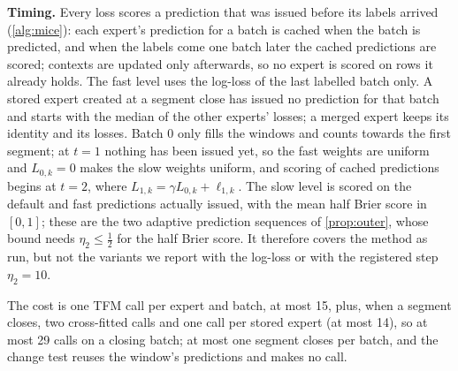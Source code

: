 \documentclass[11pt]{article}
\theoremstyle{plain}
\theoremstyle{definition}
\theoremstyle{remark}
\begin{document}
\textbf{Timing.} Every loss scores a prediction that was issued before its labels arrived
(\cref{alg:mice}): each expert's prediction for a batch is cached when the batch is predicted, and when the labels
come one batch later the cached predictions are scored; contexts are updated only afterwards, so no expert is scored
on rows it already holds. The fast level uses the log-loss of the last labelled batch only. A stored expert created
at a segment close has issued no prediction for that batch and starts with the median of the other experts' losses;
a merged expert keeps its identity and its losses. Batch 0 only fills the windows and counts towards the first
segment; at $t=1$ nothing has been issued yet, so the fast weights are uniform and $L_{0,k}=0$ makes the slow weights
uniform, and scoring of cached predictions begins at $t=2$, where $L_{1,k}=\gamma L_{0,k}+\ell_{1,k}$. The slow level is scored on the default and fast predictions actually issued, with the mean half
Brier score in $[0,1]$; these are the two adaptive prediction sequences of \cref{prop:outer}, whose bound needs
$\eta_2\le\tfrac12$ for the half Brier score. It therefore covers the method as run, but not the variants we report
with the log-loss or with the registered step $\eta_2=10$.


The cost is one TFM call per expert and batch, at most 15, plus, when a segment closes, two cross-fitted calls
and one call per stored expert (at most 14), so at most 29 calls on a closing batch; at most one segment closes per
batch, and the change test reuses the window's predictions and makes no call.
\end{document}
